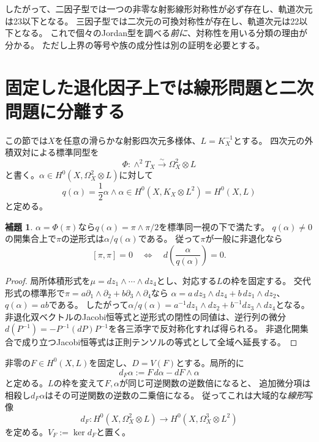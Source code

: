 \documentclass[a4paper,11pt]{ltjsarticle}
\theoremstyle{definition}
\newtheorem{lemma}[theorem]{補題}
\theoremstyle{definition}\newtheorem{definition}[theorem]{定義}
\theoremstyle{remark}\newtheorem{remark}[theorem]{注意}
\begin{document}
したがって、二因子型では一つの非零な射影線形対称性が必ず存在し、軌道次元は23以下となる。
三因子型では二次元の可換対称性が存在し、軌道次元は22以下となる。
これで個々のJordan型を調べる\emph{前に}、対称性を用いる分類の理由が分かる。
ただし上界の等号や族の成分性は別の証明を必要とする。

\section{固定した退化因子上では線形問題と二次問題に分離する}
この節では$X$を任意の滑らかな射影四次元多様体、$L=K_X^{-1}$とする。
四次元の外積双対による標準同型を
\[
 \Phi:\wedge^2T_X\xrightarrow{\sim}\Omega_X^2\otimes L
\]
と書く。$\alpha\in H^0(X,\Omega_X^2\otimes L)$に対して
\[
 q(\alpha)=\frac12\alpha\wedge\alpha
       \in H^0(X,K_X\otimes L^2)=H^0(X,L)
\]
と定める。

\begin{lemma}\label{lem:inverse}
$\alpha=\Phi(\pi)$なら$q(\alpha)=\pi\wedge\pi/2$を標準同一視の下で満たす。
$q(\alpha)\ne0$の開集合上で$\pi$の逆形式は$\alpha/q(\alpha)$である。
従って$\pi$が一般に非退化なら
\[
 [\pi,\pi]=0\quad\Longleftrightarrow\quad
 d\left(\frac{\alpha}{q(\alpha)}\right)=0.
\]
\end{lemma}
\begin{proof}
局所体積形式を$\mu=dz_1\wedge\cdots\wedge dz_4$とし、対応する$L$の枠を固定する。
交代形式の標準形で$\pi=a\partial_1\wedge\partial_2+b\partial_3\wedge\partial_4$なら
$\alpha=a\,dz_3\wedge dz_4+b\,dz_1\wedge dz_2$、$q(\alpha)=ab$である。
したがって$\alpha/q(\alpha)=a^{-1}dz_1\wedge dz_2+b^{-1}dz_3\wedge dz_4$となる。
非退化双ベクトルのJacobi恒等式と逆形式の閉性の同値は、逆行列の微分
$d(P^{-1})=-P^{-1}(dP)P^{-1}$を各三添字で反対称化すれば得られる。
非退化開集合で成り立つJacobi恒等式は正則テンソルの等式として全域へ延長する。
\end{proof}

非零の$F\in H^0(X,L)$を固定し、$D=V(F)$とする。局所的に
\[
 d_F\alpha:=F\,d\alpha-dF\wedge\alpha
\]
と定める。$L$の枠を変えて$F,\alpha$が同じ可逆関数の逆数倍になると、
追加微分項は相殺し$d_F\alpha$はその可逆関数の逆数の二乗倍になる。
従ってこれは大域的な\emph{線形}写像
\[
 d_F:H^0(X,\Omega_X^2\otimes L)\longrightarrow
       H^0(X,\Omega_X^3\otimes L^2)
\]
を定める。$V_F:=\ker d_F$と置く。
\end{document}
